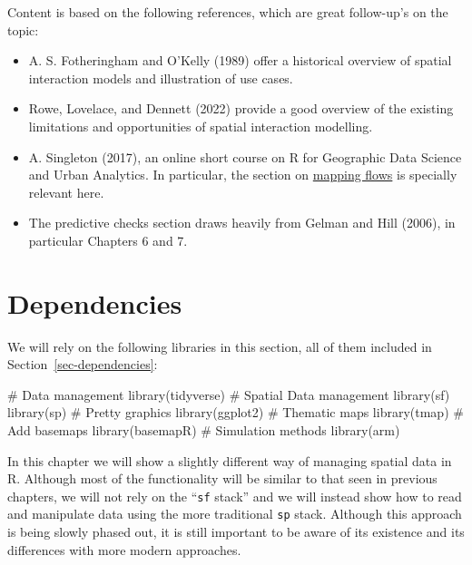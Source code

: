 \documentclass[
  letterpaper,
  DIV=11,
  numbers=noendperiod,
  oneside]{scrreprt}
\newenvironment{Shaded}{\begin{snugshade}}{\end{snugshade}}
\newcommand{\CommentTok}[1]{\textcolor[rgb]{0.37,0.37,0.37}{#1}}
\newcommand{\FunctionTok}[1]{\textcolor[rgb]{0.28,0.35,0.67}{#1}}
\newcommand{\NormalTok}[1]{\textcolor[rgb]{0.00,0.23,0.31}{#1}}
\providecommand{\tightlist}{%
  \setlength{\itemsep}{0pt}\setlength{\parskip}{0pt}}\usepackage{longtable,booktabs,array}
\begin{document}
Content is based on the following references, which are great
follow-up's on the topic:

\begin{itemize}
\tightlist
\item
  A. S. Fotheringham and O'Kelly (1989) offer a historical overview of
  spatial interaction models and illustration of use cases.
\item
  Rowe, Lovelace, and Dennett (2022) provide a good overview of the
  existing limitations and opportunities of spatial interaction
  modelling.
\item
  A. Singleton (2017), an online short course on R for Geographic Data
  Science and Urban Analytics. In particular, the section on
  \href{https://github.com/alexsingleton/GDS_UA_2017/tree/master/Mapping_Flows}{mapping
  flows} is specially relevant here.
\item
  The predictive checks section draws heavily from Gelman and Hill
  (2006), in particular Chapters 6 and 7.
\end{itemize}

\section{Dependencies}\label{dependencies-2}

We will rely on the following libraries in this section, all of them
included in Section~\ref{sec-dependencies}:

\begin{Shaded}
\begin{Highlighting}[]
\CommentTok{\# Data management}
\FunctionTok{library}\NormalTok{(tidyverse)}
\CommentTok{\# Spatial Data management}
\FunctionTok{library}\NormalTok{(sf)}
\FunctionTok{library}\NormalTok{(sp)}
\CommentTok{\# Pretty graphics}
\FunctionTok{library}\NormalTok{(ggplot2)}
\CommentTok{\# Thematic maps}
\FunctionTok{library}\NormalTok{(tmap)}
\CommentTok{\# Add basemaps}
\FunctionTok{library}\NormalTok{(basemapR)}
\CommentTok{\# Simulation methods}
\FunctionTok{library}\NormalTok{(arm)}
\end{Highlighting}
\end{Shaded}

In this chapter we will show a slightly different way of managing
spatial data in R. Although most of the functionality will be similar to
that seen in previous chapters, we will not rely on the ``\texttt{sf}
stack'' and we will instead show how to read and manipulate data using
the more traditional \texttt{sp} stack. Although this approach is being
slowly phased out, it is still important to be aware of its existence
and its differences with more modern approaches.
\end{document}

